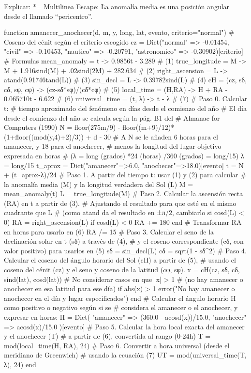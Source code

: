 Explicar:
*=
Multilinea
Escape: \"



La anomalía media es una posición angular desde el llamado ``pericentro''.

function amanecer_anochecer(d, m, y, long, lat, evento, criterio="normal")
	# Coseno del cénit según el criterio escogido
	cz = Dict("normal" => -0.01454,
		"civil" => -0.10453,
		"nautico" => -0.20791,
		"astronomico" => -0.30902)[criterio]
	# Formulas
	mean_anomaly = t -> 0.9856t - 3.289                             # (1)
	true_longitude = M -> M + 1.916sind(M) + .02sind(2M) + 282.634  # (2)
	right_ascension = L -> atand(0.91746tand(L))                    # (3)
	sin_decl = L -> 0.39782sind(L)                                  # (4)
	cH = (cz, sδ, cδ, sφ, cφ) -> (cz-sδ*sφ)/(cδ*cφ)                 # (5)
	local_time = (H,RA) -> H + RA - 0.065710t - 6.622               # (6)
	universal_time = (t, λ) -> t - λ                                # (7)
	# Paso 0. Calcular t:
	# tiempo aproximado del fenómeno en días desde el comienzo del año
	# El día desde el comienzo del año se calcula según la pág. B1 del
	# Almanac for Computers (1990)
	N = floor(275m/9) - floor((m+9)/12)*(1+floor((mod(y,4)+2)/3)) + d - 30
	# A N se le añaden 6 horas para el amanecer, y 18 para el anochecer,
	# menos la longitud del lugar objetivo expresada en horas
	# (λ = long (grados) *24 (horas) /360 (grados) = long/15)
	λ = long/15
	t_aprox = Dict("amanecer"=>6.0, "anochecer"=>18.0)[evento]
	t = N + (t_aprox-λ)/24
	# Paso 1. A partir del tiempo t: usar (1) y (2) para calcular
	# la anomalía media (M) y la longitud verdadera del Sol (L)
	M = mean_anomaly(t)
	L = true_longitude(M)
	# Paso 2. Calcular la ascensión recta (RA) en t a partir de (3).
	# Ajustando el resultado para que esté en el mismo cuadrante que L
	# (como atand da el resultado en ±π/2, cambiarlo si cosd(L) < 0)
	RA = right_ascension(L)
	if cosd(L) < 0
		RA += 180
	end
	# Transformar RA en horas para usarlo en (6)
	RA /= 15
	# Paso 3. Calcular el seno de la declinación solar en t (sδ) a través de (4),
	# y el coseno correspondiente (cδ, con valor positivo) para usarlos en (5)
	sδ = sin_decl(L)
	cδ = sqrt(1 - sδ^2)
	# Paso 4. Calcular el coseno del ángulo horario del Sol (cH) a partir de (5),
	# usando el coseno del cénit (cz) y el seno y coseno de la latitud (cφ, sφ).
	x = cH(cz, sδ, cδ, sind(lat), cosd(lat))
	# No considerar casos en que |x| > 1
	# (no hay amanecer o anochecer en esa latitud para ese día)
	if abs(x) > 1
		error("No hay amanecer o anochecer en el día y lugar especificados")
	end
	# Calcular el ángulo horario H como positivo o negativo según si se
	# considera el amanecer o el anochecer, y expresar en horas:
	H = Dict(
		"amanecer" => (360.0 - acosd(x))/15.0,
		"anochecer" => acosd(x)/15.0
		)[evento]
	# Paso 5. Calcular la hora local exacta del amanecer y el anochecer (T)
	# a partir de (6), convertida al rango (0-24h)
	T = mod(local_time(H, RA), 24)
	# Paso 6. Convertir a hora universal (desde el meridiano de Greenwich)
	# usando la ecuación (7)
	UT = mod(universal_time(T, λ), 24)
end


